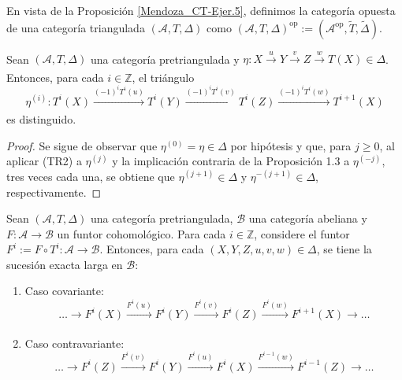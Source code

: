\documentclass[tesis]{subfiles}
\begin{document}
\begin{Obs}\label{Obs: Mendoza_CT-Ejer.5}

    En vista de la Proposición \ref{Mendoza_CT-Ejer.5}, definimos la categoría opuesta de una categoría triangulada $(\mathscr{A},T,\Delta)$ como $(\mathscr{A},T,\Delta)^\text{op}:= (\mathscr{A}^\text{op}, \tilde{T}, \tilde{\Delta})$. 
\end{Obs}

\begin{Lema}\label{Mendoza_CT-Ejer.6}

    Sean $(\mathscr{A},T,\Delta)$ una categoría pretriangulada y $\eta:X\xrightarrow[]{u}Y\xrightarrow[]{v}Z\xrightarrow[]{w}T(X)\in\Delta$. Entonces, para cada $i\in\mathbb{Z}$, el triángulo
    \[
        \eta^{(i)}: T^i(X) \xrightarrow[]{(-1)^i T^i(u)} T^i(Y) \xrightarrow[]{(-1)^i T^i(v)} T^i(Z) \xrightarrow[]{(-1)^i T^i(w)} T^{i+1}(X)
    \] 
    es distinguido.
\end{Lema}

\begin{proof}

    Se sigue de observar que $\eta^{(0)}=\eta\in\Delta$ por hipótesis y que, para $j\geq0$, al aplicar (TR2) a $\eta^{(j)}$ y la implicación contraria de la Proposición 1.3 a $\eta^{(-j)}$, tres veces cada una, se obtiene que $\eta^{(j+1)}\in\Delta$ y $\eta^{-(j+1)}\in\Delta$, respectivamente.
\end{proof}

\begin{Teo}\label{Mendoza_CT-Ejer.7}

    Sean $(\mathscr{A},T,\Delta)$ una categoría pretriangulada, $\mathscr{B}$ una categoría abeliana y $F:\mathscr{A}\to \mathscr{B}$ un funtor cohomológico. Para cada $i\in\mathbb{Z}$, considere el funtor $F^i:= F\circ T^i:\mathscr{A}\to \mathscr{B}$. Entonces, para cada $(X,Y,Z,u,v,w)\in\Delta$, se tiene la sucesión exacta larga en $\mathscr{B}$:

    \begin{enumerate}[label=(\alph*)]
    
        \item Caso covariante:
            \[
                \dots \to F^i(X)\xrightarrow[]{F^i(u)} F^i(Y)\xrightarrow[]{F^i(v)} F^i(Z)\xrightarrow[]{F^i(w)} F^{i+1}(X)\to \dots
            \] 

        \item Caso contravariante:
            \[
                \dots \to F^i(Z)\xrightarrow[]{F^i(v)} F^i(Y)\xrightarrow[]{F^i(u)} F^i(X)\xrightarrow[]{F^{i-1}(w)} F^{i-1}(Z)\to \dots
            \] 
            
    \end{enumerate}
\end{Teo}
\end{document}

